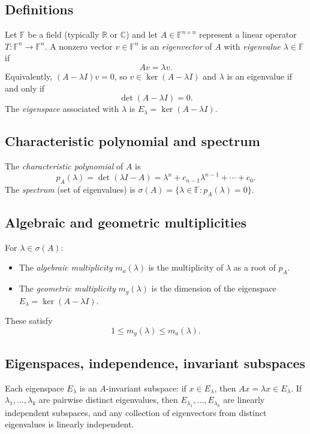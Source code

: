\documentclass[12pt,a4paper]{article}
\theoremstyle{plain}
\theoremstyle{definition}
\theoremstyle{remark}
\theoremstyle{remark}
\begin{document}
	\subsection*{Definitions}
	Let $\mathbb{F}$ be a field (typically $\mathbb{R}$ or $\mathbb{C}$) and let $A\in\mathbb{F}^{n\times n}$ represent a linear operator $T:\mathbb{F}^n\to\mathbb{F}^n$.
	A nonzero vector $v\in\mathbb{F}^n$ is an \emph{eigenvector} of $A$ with \emph{eigenvalue} $\lambda\in\mathbb{F}$ if
	\[
	A v = \lambda v.
	\]
	Equivalently, $(A-\lambda I)v=0$, so $v\in\ker(A-\lambda I)$ and $\lambda$ is an eigenvalue if and only if
	\[
	\det(A-\lambda I)=0.
	\]
	The \emph{eigenspace} associated with $\lambda$ is $E_\lambda=\ker(A-\lambda I)$.
	
	\subsection*{Characteristic polynomial and spectrum}
	The \emph{characteristic polynomial} of $A$ is
	\[
	p_A(\lambda)=\det(\lambda I - A)=\lambda^n+c_{n-1}\lambda^{n-1}+\cdots+c_0.
	\]
	The \emph{spectrum} (set of eigenvalues) is $\sigma(A)=\{\lambda\in\mathbb{F}:p_A(\lambda)=0\}$.
	
	\subsection*{Algebraic and geometric multiplicities}
	For $\lambda\in\sigma(A)$:
	\begin{itemize}
		\item The \emph{algebraic multiplicity} $m_a(\lambda)$ is the multiplicity of $\lambda$ as a root of $p_A$.
		\item The \emph{geometric multiplicity} $m_g(\lambda)$ is the dimension of the eigenspace $E_\lambda=\ker(A-\lambda I)$.
	\end{itemize}
	These satisfy
	\[
	1 \le m_g(\lambda)\le m_a(\lambda).
	\]
	
	\subsection*{Eigenspaces, independence, invariant subspaces}
	Each eigenspace $E_\lambda$ is an $A$-invariant subspace: if $x\in E_\lambda$, then $A x=\lambda x\in E_\lambda$.
	If $\lambda_1,\dots,\lambda_k$ are pairwise distinct eigenvalues, then $E_{\lambda_1},\dots,E_{\lambda_k}$ are linearly independent subspaces, and any collection of eigenvectors from distinct eigenvalues is linearly independent.
	
\end{document}
